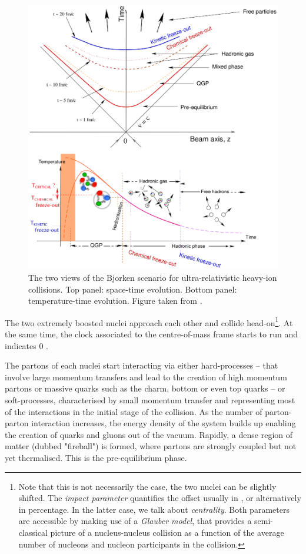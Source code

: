 \begin{figure}[h]
	\centering
	\includegraphics[width=\textwidth]{Figs/Chapter2/Schema-BjorkenScenario.eps}
	\caption{The two views of the Bjorken scenario for ultra-relativistic heavy-ion collisions. Top panel: space-time evolution. Bottom panel: temperature-time evolution. Figure taken from \cite{maireTwoViewsBjorken2011}.}
	\label{fig:QGPEvol}
\end{figure}

The two extremely boosted nuclei approach each other and collide head-on\footnote{Note that this is not necessarily the case, the two nuclei can be slightly shifted. The \textit{impact parameter} quantifies the offset usually in \fm, or alternatively in percentage. In the latter case, we talk about \textit{centrality}. Both parameters are accessible by making use of a \textit{Glauber model}, that provides a semi-classical picture of a nucleus-nucleus collision as a function of the average number of nucleons and nucleon participants in the collision.}. At the same time, the clock associated to the centre-of-mass frame starts to run and indicates 0 \fmC. 

The partons of each nuclei start interacting via either hard-processes -- that involve large momentum transfers and lead to the creation of high momentum partons or massive quarks such as the charm, bottom or even top quarks -- or soft-processes, characterised by small momentum transfer and representing most of the interactions in the initial stage of the collision. As the number of parton-parton interaction increases, the energy density of the system builds up enabling the creation of quarks and gluons out of the vacuum. Rapidly, a dense region of matter (dubbed "fireball") is formed, where partons are strongly coupled but not yet thermalised. This is the pre-equilibrium phase.

